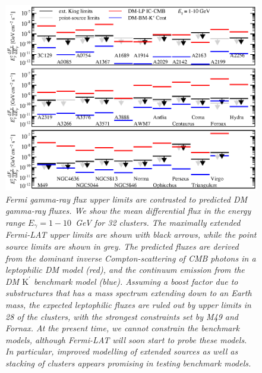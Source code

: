 \documentclass[10pt,aps,pra,reprint,amsmath,amsfonts,amssymb,showpacs,nofootinbib,floatfix]{revtex4-1}
\newcommand{\Fermi}{{\em Fermi}\xspace}
\newcommand{\rmn}{\mathrm}
\newcommand{\Kp}{\rmn{K}^\prime}
\begin{document}
\begin{figure}
\begin{minipage}{2.0\columnwidth}
  \includegraphics[width=0.99\columnwidth]{figures/Fermi.comp.DM.eps}
  \caption{\it \Fermi gamma-ray flux upper limits are contrasted to
    predicted DM gamma-ray fluxes. We show the mean differential flux
    in the energy range $E_\gamma=1-10$~GeV for 32 clusters. The
    maximally extended \Fermi-LAT upper limits are shown with black
    arrows, while the point source limits are shown in grey. The
    predicted fluxes are derived from the dominant inverse
    Compton-scattering of CMB photons in a leptophilic DM model (red),
    and the continuum emission from the DM $\Kp$ benchmark model
    (blue). Assuming a boost factor due to substructures that has a
    mass spectrum extending down to an Earth mass, the expected
    leptophilic fluxes are ruled out by upper limits in 28 of the
    clusters, with the strongest constraints set by M49 and Fornax. At
    the present time, we cannot constrain the benchmark models,
    although \Fermi-LAT will soon start to probe these models. In
    particular, improved modelling of extended sources as well as
    stacking of clusters appears promising in testing benchmark
    models.}
 \label{fig14}
\end{minipage}
\end{figure}
\end{document}
